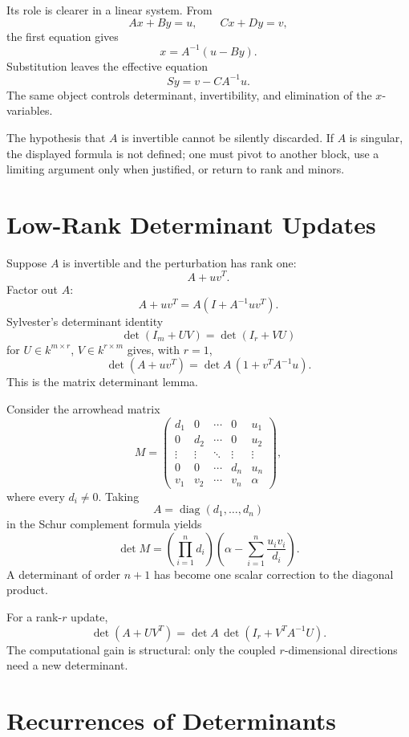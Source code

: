 Its role is clearer in a linear system.  From
\[
  A x+B y=u,
  \qquad
  C x+D y=v,
\]
the first equation gives
\[
  x=A^{-1}(u-By).
\]
Substitution leaves the effective equation
\[
  Sy=v-CA^{-1}u.
\]
The same object controls determinant, invertibility, and elimination of the \(x\)-variables.

The hypothesis that \(A\) is invertible cannot be silently discarded.  If \(A\) is singular, the displayed formula is not defined; one must pivot to another block, use a limiting argument only when justified, or return to rank and minors.

\section{Low-Rank Determinant Updates}

Suppose \(A\) is invertible and the perturbation has rank one:
\[
  A+uv^T.
\]
Factor out \(A\):
\[
  A+uv^T=A(I+A^{-1}uv^T).
\]
Sylvester's determinant identity
\[
  \det(I_m+UV)=\det(I_r+VU)
\]
for \(U\in k^{m\times r}\), \(V\in k^{r\times m}\) gives, with \(r=1\),
\[
  \boxed{
  \det(A+uv^T)
  =\det A\,(1+v^TA^{-1}u).}
\]
This is the matrix determinant lemma.

Consider the arrowhead matrix
\[
  M=
  \begin{pmatrix}
    d_1&0&\cdots&0&u_1\\
    0&d_2&\cdots&0&u_2\\
    \vdots&\vdots&\ddots&\vdots&\vdots\\
    0&0&\cdots&d_n&u_n\\
    v_1&v_2&\cdots&v_n&\alpha
  \end{pmatrix},
\]
where every \(d_i\ne0\).  Taking
\[
  A=\operatorname{diag}(d_1,\ldots,d_n)
\]
in the Schur complement formula yields
\[
  \det M
  =\left(\prod_{i=1}^n d_i\right)
   \left(
   \alpha-\sum_{i=1}^n\frac{u_iv_i}{d_i}
   \right).
\]
A determinant of order \(n+1\) has become one scalar correction to the diagonal product.

For a rank-\(r\) update,
\[
  \det(A+UV^T)
  =\det A\,\det(I_r+V^TA^{-1}U).
\]
The computational gain is structural: only the coupled \(r\)-dimensional directions need a new determinant.

\section{Recurrences of Determinants}

